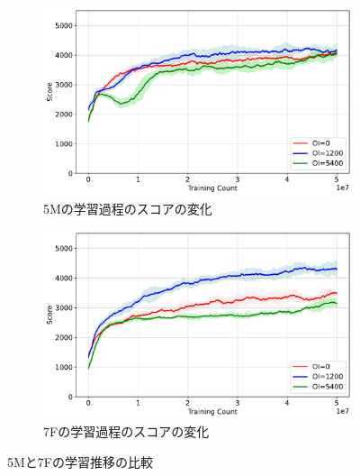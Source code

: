 \begin{figure}[t]
    \centering
    \begin{subfigure}[b]{\linewidth}
        \centering
        \includegraphics[width=\linewidth]{pdf/learning_progress_plots/learning_progress_NT5M_tuple298_combined.pdf}
        \caption{5Mの学習過程のスコアの変化}
        \label{fig:learning_progress_NT5M}
    \end{subfigure}

    \vspace{1em}
    \begin{subfigure}[b]{\linewidth}
        \centering
        \includegraphics[width=\linewidth]{pdf/learning_progress_plots/learning_progress_NT7F_tuple0_combined.pdf}
        \caption{7Fの学習過程のスコアの変化}
        \label{fig:learning_progress_NT7F}
    \end{subfigure}

    \caption{5Mと7Fの学習推移の比較}
    \label{fig:learning_progress_comparison}
\end{figure}

